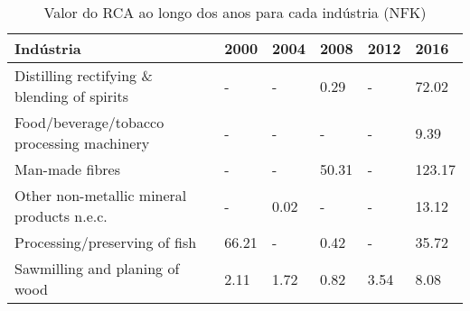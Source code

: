\begin{table}
\centering
\caption{Valor do RCA ao longo dos anos para cada indústria (NFK)}
\label{tab:ex3-tempo-NFK}
\begin{tabular}{p{6cm}p{1.5cm}p{1.5cm}p{1.5cm}p{1.5cm}p{1.5cm}}
\toprule
                                  Indústria &  2000 & 2004 &  2008 & 2012 &   2016 \\
\midrule
Distilling rectifying \& blending of spirits &     - &    - &  0.29 &    - &  72.02 \\
 Food/beverage/tobacco processing machinery &     - &    - &     - &    - &   9.39 \\
                            Man-made fibres &     - &    - & 50.31 &    - & 123.17 \\
 Other non-metallic mineral products n.e.c. &     - & 0.02 &     - &    - &  13.12 \\
              Processing/preserving of fish & 66.21 &    - &  0.42 &    - &  35.72 \\
             Sawmilling and planing of wood &  2.11 & 1.72 &  0.82 & 3.54 &   8.08 \\
\bottomrule
\end{tabular}
\end{table}
